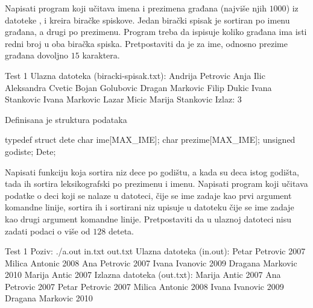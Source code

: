 \begin{Answer}[ref=508]
\end{Answer}
\begin{Exercise}[label=509]
  Napisati program koji učitava imena i prezimena građana (najviše
  njih $1000$) iz datoteke , i kreira
  biračke spiskove. Jedan birački spisak je sortiran po imenu građana,
  a drugi po prezimenu. Program treba da ispisuje koliko građana ima
  isti redni broj u oba biračka spiska. Pretpostaviti da je za ime,
  odnosno prezime građana dovoljno $15$ karaktera.

\begin{maxitest}
\begin{test}{Test 1}
Ulazna datoteka (biracki-spisak.txt):
  Andrija Petrovic
  Anja Ilic
  Aleksandra Cvetic
  Bojan Golubovic
  Dragan Markovic
  Filip Dukic
  Ivana Stankovic
  Ivana Markovic
  Lazar Micic
  Marija Stankovic
Izlaz: 3
\end{test}
\end{maxitest}
  
\end{Exercise}

\begin{Answer}[ref=509]
\end{Answer}
\begin{Exercise}[label=510]
  Definisana je struktura podataka
\begin{ckod}
typedef struct dete
{
      char ime[MAX_IME];
      char prezime[MAX_IME];
      unsigned godiste;
} Dete;
\end{ckod}
Napisati funkciju koja sortira niz dece po godištu, a kada su deca
istog godišta, tada ih sortira leksikografski po prezimenu i
imenu. Napisati program koji učitava podatke o deci koji se nalaze u
datoteci, čije se ime zadaje kao prvi argument komandne linije,
sortira ih i sortirani niz upisuje u datoteku čije se ime zadaje kao
drugi argument komandne linije. Pretpostaviti da u ulaznoj datoteci
nisu zadati podaci o više od $128$ deteta.
  
\begin{miditest}
\begin{test}{Test 1}
Poziv: ./a.out in.txt out.txt
Ulazna datoteka (in.out):
  Petar Petrovic 2007
  Milica Antonic 2008
  Ana Petrovic 2007
  Ivana Ivanovic 2009
  Dragana Markovic 2010
  Marija Antic 2007
Izlazna datoteka (out.txt):
  Marija Antic 2007
  Ana Petrovic 2007
  Petar Petrovic 2007
  Milica Antonic 2008
  Ivana Ivanovic 2009
  Dragana Markovic 2010
\end{test}
\end{miditest}
  
\end{Exercise}

